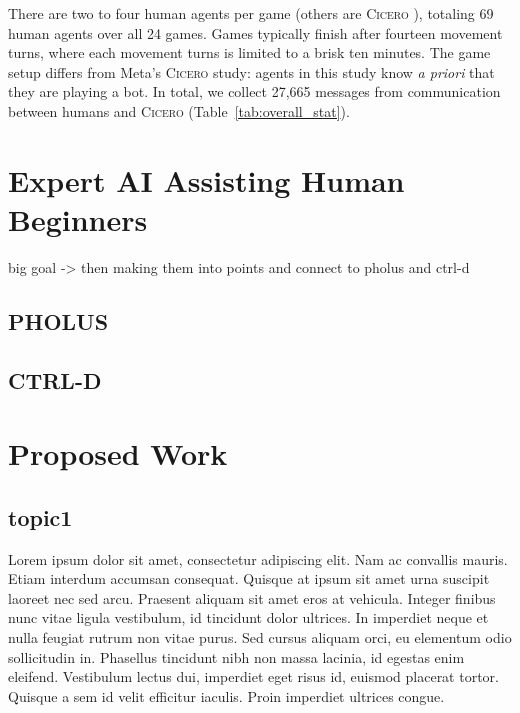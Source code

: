 \documentclass[oneside]{memoir}
\newcommand{\cicero}{\abr{Cicero} }
\newcommand{\abr}[1]{\textsc{#1}}
\begin{document}
There are two to four human agents per game (others are \cicero), totaling 69 human agents over all 24 games.
Games typically finish after fourteen movement turns, where each movement turns is limited to a brisk ten minutes. 
%
%
The game setup differs from Meta's \cicero study: agents in this study know \emph{a priori} that they are playing a bot.
%
%
In total, we collect 27,665 messages from communication between humans
and \cicero (Table~\ref{tab:overall_stat}).

%
%

\chapter{Expert AI Assisting Human Beginners}
\label{ch:expert_AI}
big goal -> then making them into points and connect to pholus and ctrl-d 
\section{PHOLUS}
\label{sec:pholus}
\section{CTRL-D}
\label{sec:ctrld}

%
%

\chapter{Proposed Work}
\label{ch:proposal}

\section{topic1}

Lorem ipsum dolor sit amet, consectetur adipiscing elit. Nam ac convallis mauris. Etiam interdum accumsan consequat. Quisque at ipsum sit amet urna suscipit laoreet nec sed arcu. Praesent aliquam sit amet eros at vehicula. Integer finibus nunc vitae ligula vestibulum, id tincidunt dolor ultrices. In imperdiet neque et nulla feugiat rutrum non vitae purus. Sed cursus aliquam orci, eu elementum odio sollicitudin in. Phasellus tincidunt nibh non massa lacinia, id egestas enim eleifend. Vestibulum lectus dui, imperdiet eget risus id, euismod placerat tortor. Quisque a sem id velit efficitur iaculis. Proin imperdiet ultrices congue.
\end{document}
